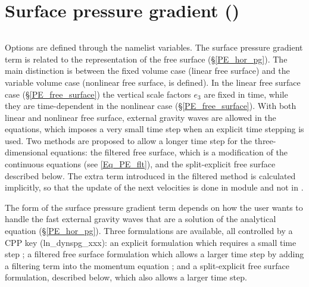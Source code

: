 \documentclass[NEMO_book]{subfiles}
\begin{document}
\section  [Surface pressure gradient (\textit{dynspg}) ]
		{Surface pressure gradient ()}
\label{DYN_spg}

$\ $\newline      %

Options are defined through the  namelist variables.
The surface pressure gradient term is related to the representation of the free surface (\S\ref{PE_hor_pg}). 
The main distinction is between the fixed volume case (linear free surface) and the variable volume case 
(nonlinear free surface,  is defined). In the linear free surface case (\S\ref{PE_free_surface}) 
the vertical scale factors $e_{3}$ are fixed in time, while they are time-dependent in the nonlinear case 
(\S\ref{PE_free_surface}). 
With both linear and nonlinear free surface, external gravity waves are allowed in the equations, 
which imposes a very small time step when an explicit time stepping is used. 
Two methods are proposed to allow a longer time step for the three-dimensional equations: 
the filtered free surface, which is a modification of the continuous equations (see \eqref{Eq_PE_flt}), 
and the split-explicit free surface described below. 
The extra term introduced in the filtered method is calculated implicitly, 
so that the update of the next velocities is done in module  and not in .


The form of the surface pressure gradient term depends on how the user wants to handle 
the fast external gravity waves that are a solution of the analytical equation (\S\ref{PE_hor_pg}). 
Three formulations are available, all controlled by a CPP key (ln\_dynspg\_xxx):
an explicit formulation which requires a small time step ;
a filtered free surface formulation which allows a larger time step by adding a filtering 
term into the momentum equation ; 
and a split-explicit free surface formulation, described below, which also allows a larger time step.
\end{document}
